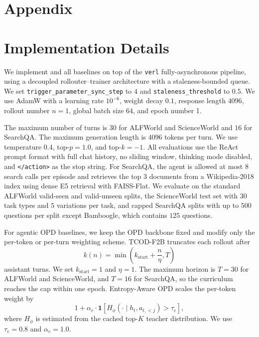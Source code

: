 \appendix
\section*{Appendix}

\section{Implementation Details}
\label{sec:implementation_details}


We implement \ours{} and all baselines on top of the \texttt{verl} fully-asynchronous pipeline, using a decoupled rollouter--trainer architecture with a staleness-bounded queue. We set \texttt{trigger\_parameter\_sync\_step} to $4$ and \texttt{staleness\_threshold} to $0.5$. We use AdamW with a learning rate $10^{-6}$, weight decay $0.1$, response length $4096$, rollout number $n=1$, global batch size 64, and epoch number 1. 

The maximum number of turns is $30$ for ALFWorld and ScienceWorld and $16$ for SearchQA.
%
The maximum generation length is $4096$ tokens per turn.
%
We use temperature $0.4$, top-$p=1.0$, and top-$k=-1$.
%
All evaluations use the ReAct prompt format with full chat history, no sliding window, thinking mode disabled, and \texttt{</action>} as the stop string.
%
For SearchQA, the agent is allowed at most $8$ search calls per episode and retrieves the top $3$ documents from a Wikipedia-2018 index using dense E5 retrieval with FAISS-Flat.
%
We evaluate on the standard ALFWorld valid-seen and valid-unseen splits, the ScienceWorld test set with $30$ task types and $5$ variations per task, and capped SearchQA splits with up to $500$ questions per split except Bamboogle, which contains $125$ questions.


For agentic OPD baselines, we keep the OPD backbone fixed and modify only the per-token or per-turn weighting scheme. TCOD-F2B truncates each rollout after
\begin{equation}
    k(n) = \min\left(k_{\mathrm{start}} + \frac{n}{\eta}, T\right)
\end{equation}
assistant turns. We set $k_{\mathrm{start}}=1$ and $\eta=1$. The maximum horizon is $T=30$ for ALFWorld and ScienceWorld, and $T=16$ for SearchQA, so the curriculum reaches the cap within one epoch. Entropy-Aware OPD scales the per-token weight by
\begin{equation}
    1 + \alpha_e \cdot \mathbf{1}
    \left[
    H_{\phi}(\cdot \mid h_t,a_{t,<j}) > \tau_e
    \right],
\end{equation}
where $H_{\phi}$ is estimated from the cached top-$K$ teacher distribution. We use $\tau_e=0.8$ and $\alpha_e=1.0$.

